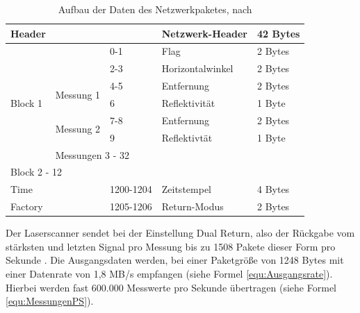 \documentclass[a4paper,12pt,bibliography=totoc, listof=totoc,titlepage]{scrreprt}
\begin{document}
\begin{table}[!ht]
\centering
\begin{tabular}{|lll|l|l|}
\hline
Header                                         &                                 
                &           & Netzwerk-Header  & 42 Bytes \\ \hline
\multicolumn{1}{|l|}{\multirow{7}{*}{Block 1}} &                                 
                & 0-1       & Flag             & 2 Bytes  \\ \cline{2-5} 
\multicolumn{1}{|l|}{}                         &                                 
                & 2-3       & Horizontalwinkel & 2 Bytes  \\ \cline{2-5} 
\multicolumn{1}{|l|}{}                         & 
\multicolumn{1}{l|}{\multirow{2}{*}{Messung 1}} & 4-5       & Entfernung       & 
2 Bytes  \\ \cline{3-5} 
\multicolumn{1}{|l|}{}                         & \multicolumn{1}{l|}{}           
                & 6         & Reflektivität    & 1 Byte   \\ \cline{2-5} 
\multicolumn{1}{|l|}{}                         & 
\multicolumn{1}{l|}{\multirow{2}{*}{Messung 2}} & 7-8       & Entfernung       & 
2 Bytes  \\ \cline{3-5} 
\multicolumn{1}{|l|}{}                         & \multicolumn{1}{l|}{}           
                & 9         & Reflektivtät     & 1 Byte   \\ \cline{2-5} 
\multicolumn{1}{|l|}{}                         & \multicolumn{4}{l|}{Messungen 3 
- 32}                                                     \\ \hline
\multicolumn{5}{|l|}{Block 2 - 12}                                               
                                                          \\ \hline
Time                                           & \multicolumn{1}{l|}{}           
                & 1200-1204 & Zeitstempel      & 4 Bytes  \\ \hline
Factory                                        & \multicolumn{1}{l|}{}           
                & 1205-1206 & Return-Modus     & 2 Bytes  \\ \hline
\end{tabular}

\caption{Aufbau der Daten des Netzwerkpaketes, nach \citet{vlpManual}}
\label{tab:datenmodell}
\end{table}

Der Laserscanner sendet bei der Einstellung Dual Return, also der Rückgabe vom stärksten und letzten Signal pro Messung 
bis zu 1508 Pakete dieser Form pro Sekunde \citep[S. 49]{vlpManual}. Die Ausgangsdaten werden, bei einer Paketgröße von 1248 Bytes mit einer Datenrate von 1,8 MB/s empfangen (siehe Formel \ref{equ:Ausgangsrate}). Hierbei werden fast 600.000 Messwerte pro Sekunde übertragen (siehe Formel \ref{equ:MessungenPS}).
\end{document}
